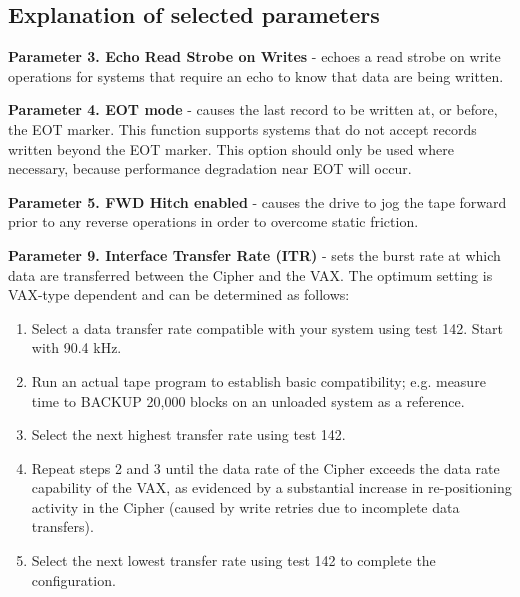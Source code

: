 \subsection{Explanation of selected parameters}

{\bf Parameter 3. Echo Read Strobe on Writes} - echoes a read strobe on write
operations for systems that require an echo to know that data are being written.

{\bf Parameter 4. EOT mode} - causes the last record to be written at, or
before, the EOT marker. This function supports systems that do not accept
records written beyond the EOT marker. This option should only be
used where necessary, because performance degradation near EOT will occur.

{\bf Parameter 5. FWD Hitch enabled} - causes the drive to jog the tape
forward prior to any reverse operations in order to overcome static friction.

{\bf Parameter 9.  Interface Transfer Rate (ITR)} - sets the burst rate at
which data are transferred between the Cipher and the VAX. The 
optimum setting is VAX-type dependent and 
can be determined as follows:

\begin{enumerate}

\item Select a data transfer rate compatible with your system using test 142.
Start with 90.4 kHz.

\item Run an actual tape program to establish basic compatibility; e.g. measure
time to BACKUP 20,000 blocks on an unloaded system as a reference.


\item Select the next highest transfer rate using test 142.

\item Repeat steps 2 and 3 until the data rate of the Cipher exceeds
the data rate capability of the VAX, as evidenced by a substantial increase
in re-positioning activity in the Cipher (caused by write retries
due to incomplete data transfers).

\item Select the next lowest transfer rate using test 142 to complete 
the configuration.

\end{enumerate}


